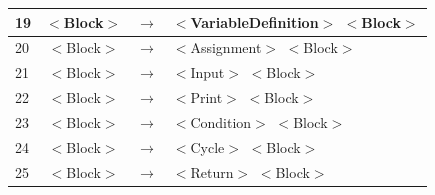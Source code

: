 \documentclass[12pt,a4paper,titlepage]{article}
\begin{document}
\begin{center}
\begin{tabular}{ | l | c  c  l | }
    19 & $<$Block$>$                    & $\rightarrow$ & $<$VariableDefinition$>$ $<$Block$>$ \\ \hline
    20 & $<$Block$>$                    & $\rightarrow$ & $<$Assignment$>$ $<$Block$>$ \\ \hline
    21 & $<$Block$>$                    & $\rightarrow$ & $<$Input$>$ $<$Block$>$ \\ \hline
    22 & $<$Block$>$                    & $\rightarrow$ & $<$Print$>$ $<$Block$>$ \\ \hline
    23 & $<$Block$>$                    & $\rightarrow$ & $<$Condition$>$ $<$Block$>$ \\ \hline
    24 & $<$Block$>$                    & $\rightarrow$ & $<$Cycle$>$ $<$Block$>$ \\ \hline
    25 & $<$Block$>$                    & $\rightarrow$ & $<$Return$>$ $<$Block$>$ \\ \hline

  \end{tabular}
\end{center}
\end{document}
